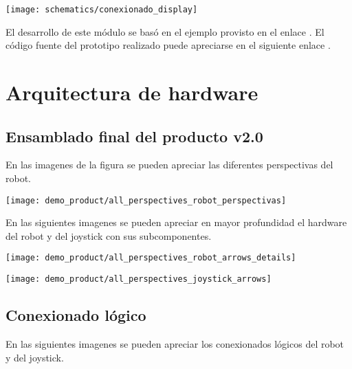 \begin{center}
\texttt{[image: schematics/conexionado\_display]}
  \label{fig:conexionado_display}

\end{center}



El desarrollo de este módulo se basó en el ejemplo provisto en el enlace \cite{ESP32_Display_Example}. El código fuente del prototipo realizado puede apreciarse en el siguiente enlace \cite{ESP32_POC_display}.


\section{Arquitectura de hardware}


\subsection{Ensamblado final del producto v2.0}

En las imagenes de la figura \cite{conexionado_fisico} se pueden apreciar las diferentes perspectivas del robot.

\begin{center}
\texttt{[image: demo\_product/all\_perspectives\_robot\_perspectivas]}
  \label{fig:conexionado_fisico}
\end{center}


En las siguientes imagenes se pueden apreciar en mayor profundidad el hardware del robot y del joystick con sus subcomponentes.

\begin{center}
\texttt{[image: demo\_product/all\_perspectives\_robot\_arrows\_details]}
  \label{fig:conexionado_fisico}
\end{center}

\begin{center}
\texttt{[image: demo\_product/all\_perspectives\_joystick\_arrows]}
  \label{fig:conexionado_fisico}
\end{center}


\subsection{Conexionado lógico }

En las siguientes imagenes se pueden apreciar los conexionados lógicos del robot y del joystick.

